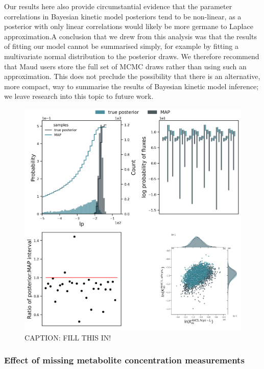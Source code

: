 \documentclass[
  letterpaper,
  DIV=11,
  numbers=noendperiod]{scrartcl}
\begin{document}
Our results here also provide circumstantial evidence that the parameter
correlations in Bayesian kinetic model posteriors tend to be non-linear,
as a posterior with only linear correlations would likely be more
germane to Laplace approximation.A conclusion that we drew from this
analysis was that the results of fitting our model cannot be summarised
simply, for example by fitting a multivariate normal distribution to the
posterior draws. We therefore recommend that Maud users store the full
set of MCMC draws rather than using such an approximation. This does not
preclude the possibility that there is an alternative, more compact, way
to summarise the results of Bayesian kinetic model inference; we leave
research into this topic to future work.

\begin{figure}

{\centering \includegraphics{./figures/laplace.png}

}

\caption{\label{fig-laplace}CAPTION: FILL THIS IN!}

\end{figure}

\hypertarget{effect-of-missing-metabolite-concentration-measurements}{%
\subsubsection{Effect of missing metabolite concentration
measurements}\label{effect-of-missing-metabolite-concentration-measurements}}
\end{document}
